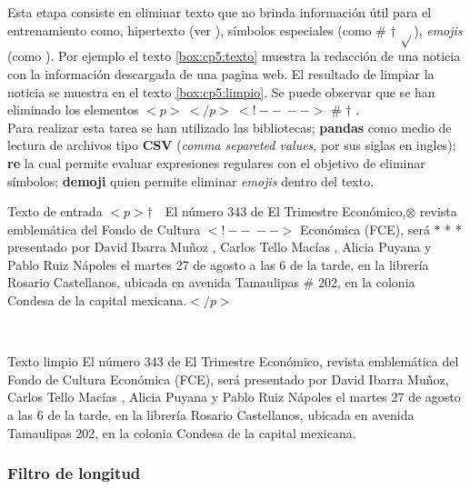 Esta etapa consiste en eliminar texto que no brinda información útil para el entrenamiento como, hipertexto (ver ), símbolos especiales (como \# $\dagger$ $\sqrt{ }$), \textit{emojis} (como \dSmiley \dCooley \dNinja). Por ejemplo el texto \ref{box:cp5:texto} muestra la redacción de una noticia con la información descargada de una pagina web. El resultado de limpiar la noticia se muestra en el texto \ref{box:cp5:limpio}. Se puede observar que se han eliminado los elementos $<p>\ </p>\ <!--\ -->$ \# $\dagger$ \dSmiley \dCooley \dInnocey.\\

Para realizar esta tarea se han utilizado las bibliotecas; \textbf{pandas} como medio de lectura de archivos tipo \textbf{CSV} (\textit{comma separeted values}, por sus siglas en ingles); \textbf{re} la cual permite evaluar expresiones regulares con el objetivo de eliminar símbolos; \textbf{demoji} quien permite eliminar \textit{emojis} dentro del texto.\\

\begin{mygraybox}[label={box:cp5:texto}]{Texto de entrada} 
$<p>\dagger$$\ \ \ $ El número 343 de El Trimestre Económico,$\otimes$ revista emblemática del Fondo de Cultura 
$<!--\ -->$
Económica (FCE), será * * * presentado por David Ibarra Muñoz \dSmiley , Carlos Tello Macías \dCooley , Alicia Puyana \dInnocey y Pablo Ruiz Nápoles el martes 27 de agosto a las 6 de la tarde, en la librería Rosario Castellanos, ubicada en avenida Tamaulipas \# 202, en la colonia Condesa de la capital mexicana.$</p>$
\end{mygraybox}

\ \\

\begin{mygraybox}[label={box:cp5:limpio}]{Texto limpio} 
El número 343 de El Trimestre Económico, revista emblemática del Fondo de Cultura 
Económica (FCE), será presentado por David Ibarra Muñoz, Carlos Tello Macías , Alicia Puyana y Pablo Ruiz Nápoles el martes 27 de agosto a las 6 de la tarde, en la librería Rosario Castellanos, ubicada en avenida Tamaulipas 202, en la colonia Condesa de la capital mexicana.
\end{mygraybox}
\subsubsection{Filtro de longitud}

